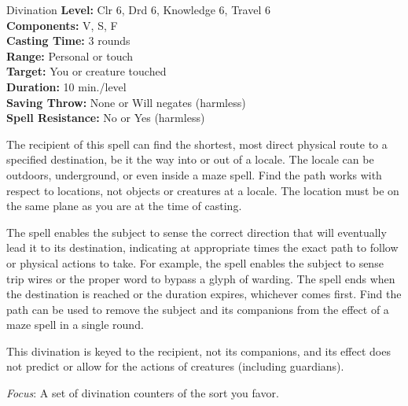 {Divination}
{
	\textbf{Level:}
	Clr 6, Drd 6, Knowledge 6, Travel 6\\
	\textbf{Components:}
	V, S, F\\
	\textbf{Casting Time:}
	3 rounds\\
	\textbf{Range:}
	Personal or touch\\
	\textbf{Target:}
	You or creature touched\\
	\textbf{Duration:}
	10 min./level\\
	\textbf{Saving Throw:}
	None or Will negates (harmless)\\
	\textbf{Spell Resistance:}
	No or Yes (harmless)\\
}
{
	The recipient of this spell can find the shortest, most direct physical route to a specified destination, be it the way into or out of a locale. The locale can be outdoors, underground, or even inside a maze spell. Find the path works with respect to locations, not objects or creatures at a locale. The location must be on the same plane as you are at the time of casting.

	The spell enables the subject to sense the correct direction that will eventually lead it to its destination, indicating at appropriate times the exact path to follow or physical actions to take. For example, the spell enables the subject to sense trip wires or the proper word to bypass a glyph of warding. The spell ends when the destination is reached or the duration expires, whichever comes first. Find the path can be used to remove the subject and its companions from the effect of a maze spell in a single round.

	This divination is keyed to the recipient, not its companions, and its effect does not predict or allow for the actions of creatures (including guardians).

	\textit{Focus}:
	A set of divination counters of the sort you favor.

}
